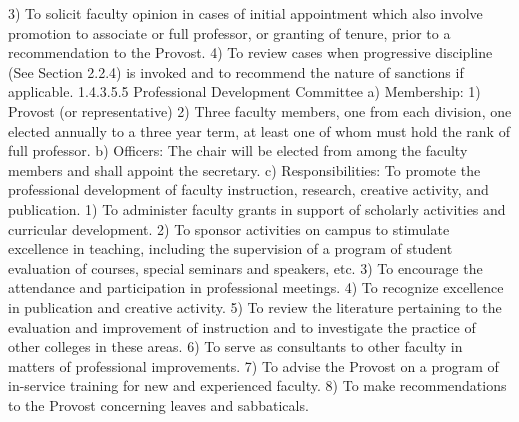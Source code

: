 \documentclass[letterpaper, 11pt]{article}
\begin{document}
				3) To solicit faculty opinion in cases of initial appointment which also involve promotion to associate or full professor, or granting of tenure, prior to a recommendation to the Provost.
				4) To review cases when progressive discipline (See Section 2.2.4) is invoked and to recommend the nature of sanctions if applicable.
				1.4.3.5.5 Professional Development Committee
				a) Membership:
				1) Provost (or representative)
				2) Three faculty members, one from each division, one elected annually to a three year term, at least one of whom must hold the rank of full professor.
				b) Officers:
				The chair will be elected from among the faculty members and shall appoint the secretary.
				c) Responsibilities:
				To promote the professional development of faculty instruction, research, creative activity, and publication.
				1) To administer faculty grants in support of scholarly activities and curricular development.
				2) To sponsor activities on campus to stimulate excellence in teaching, including the supervision of a program of student evaluation of courses, special seminars and speakers, etc.
				3) To encourage the attendance and participation in professional meetings.
				4) To recognize excellence in publication and creative activity.
				5) To review the literature pertaining to the evaluation and improvement of instruction and to investigate the practice of other colleges in these areas.
				6) To serve as consultants to other faculty in matters of professional improvements.
				7) To advise the Provost on a program of in-service training for new and experienced faculty.
				8) To make recommendations to the Provost concerning leaves and sabbaticals.
\end{document}
